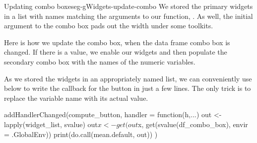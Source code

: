 \begin{example}{Updating combo boxes}{eg-gWidgets-update-combo}
We stored the primary widgets in a list with names matching the
arguments to our function, . As well, the
initial argument to the  combo box pads out the width under
some toolkits.

Here is how we update the  combo box, when the data frame
combo box is changed. If there is a value, we enable our widgets and
then populate the secondary combo box with the names of the numeric
variables.
\begin{Schunk}
\end{Schunk}
%

As we stored the widgets in an appropriately named list, we can
conveniently use  below to write the callback for
the  button in just a few lines. The only trick is to
replace the variable name with its actual value.
\begin{Schunk}
\begin{Sinput}
 addHandlerChanged(compute_button, handler = function(h,...) {
   out <- lapply(widget_list, svalue)
   out$x <- get(out$x, get(svalue(df_combo_box),
                           envir = .GlobalEnv))
   print(do.call(mean.default, out))
 })
\end{Sinput}
\end{Schunk}

\end{example}



